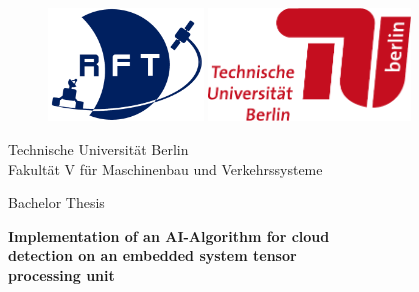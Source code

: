 
\begin{titlepage}
\thispagestyle{empty} %

\rmfamily

\vspace*{-1.5cm}

\begin{figure}[ht]
\centering
\begin{minipage}{0.45\textwidth}
    \centering
    \includegraphics[height=30mm]{files/RFT_Logo}
\end{minipage}%
\hfill
\begin{minipage}{0.45\textwidth}
    \centering
    \includegraphics[height=30mm]{files/TU_Logo_lang_RGB_rot}
\end{minipage}
\end{figure}

\vspace{2.5cm}

\begin{center}
    Technische Universität Berlin\\
    Fakultät V für Maschinenbau und Verkehrssysteme

    \vspace{2cm}

    Bachelor Thesis

    \vspace{1.5cm}

    \begin{spacing}{1.3}
    \textbf{\LARGE
        Implementation of an AI-Algorithm for cloud\\
        detection on an embedded system tensor\\
        processing unit\\}
    \end{spacing}


\end{center}
\end{titlepage}
